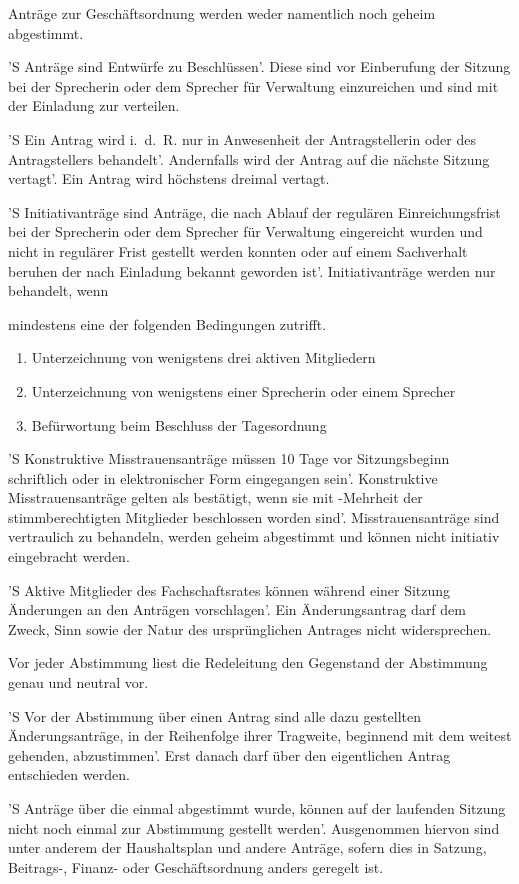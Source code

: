 \documentclass[%
	parskip=half,
]{scrartcl}
\newcommand{\edit}[1]{{\color{red} #1}}
\newcommand{\new}[1]{{\color{orange} #1}}
\begin{document}
\begin{contract}
Anträge zur Geschäftsordnung werden \edit{weder} namentlich \edit{noch} geheim abgestimmt.


'S Anträge sind Entwürfe zu Beschlüssen'. Diese sind vor Einberufung der Sitzung bei \edit{der Sprecherin oder dem 
Sprecher} für Verwaltung einzureichen und sind mit der Einladung zur verteilen.

'S Ein Antrag wird i.~d.~R. nur in Anwesenheit \edit{der Antragstellerin oder des Antragstellers} behandelt'. 
Andernfalls wird der Antrag auf die nächste Sitzung vertagt'. Ein Antrag wird höchstens dreimal vertagt.

'S Initiativanträge sind Anträge, die nach Ablauf der regulären Einreichungsfrist bei \edit{der Sprecherin oder dem
Sprecher} für Verwaltung eingereicht wurden und nicht in regulärer Frist gestellt werden konnten oder auf einem
Sachverhalt beruhen der nach Einladung bekannt geworden ist'. Initiativanträge werden nur behandelt, wenn 
\edit{mindestens eine der folgenden Bedingungen zutrifft.
\begin{enumerate}[\qquad a)]
	\item Unterzeichnung von wenigstens drei \new{aktiven} Mitgliedern
	\item Unterzeichnung von wenigstens einer Sprecherin oder einem Sprecher
	\item Befürwortung beim Beschluss der Tagesordnung
\end{enumerate}
}

'S Konstruktive Misstrauensanträge müssen 10 Tage vor Sitzungsbeginn schriftlich oder in elektronischer Form 
eingegangen sein'. Konstruktive Misstrauensanträge gelten als bestätigt, wenn sie mit -Mehrheit der 
stimmberechtigten Mitglieder beschlossen worden sind'. Misstrauensanträge sind vertraulich zu behandeln, werden geheim 
abgestimmt und können nicht initiativ eingebracht werden.

'S \new{Aktive} Mitglieder des Fachschaftsrates können während einer Sitzung Änderungen an den Anträgen vorschlagen'. 
Ein Änderungsantrag darf dem Zweck, Sinn sowie der Natur des ursprünglichen Antrages nicht widersprechen.


Vor jeder Abstimmung liest die \edit{Redeleitung} den Gegenstand der Abstimmung genau und neutral vor.

'S Vor der Abstimmung über einen Antrag sind alle dazu gestellten Änderungsanträge, in der Reihenfolge ihrer Tragweite, 
beginnend mit dem weitest gehenden, abzustimmen'. Erst danach darf über den \edit{eigentlichen Antrag} entschieden 
werden.

'S Anträge über die einmal abgestimmt wurde, können auf der laufenden Sitzung nicht noch einmal zur Abstimmung gestellt 
werden'. Ausgenommen hiervon sind unter anderem der Haushaltsplan und andere Anträge, sofern dies in Satzung, 
Beitrags-, Finanz- oder Geschäftsordnung anders geregelt ist.

\end{contract}
\end{document}

